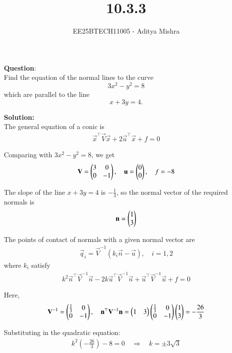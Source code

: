 \documentclass[journal]{IEEEtran}
\title{10.3.3}
\author{EE25BTECH11005 - Aditya Mishra}
\begin{document}
\maketitle

\textbf{Question}:\\
Find the equation of the normal lines to the curve 
\[
3x^2 - y^2 = 8
\] 
which are parallel to the line 
\[
x + 3y = 4.
\]

\textbf{Solution:}\\

The general equation of a conic is 
\begin{align}
\vec{x}^\top \vec{V} \vec{x} + 2\vec{u}^\top \vec{x} + f = 0
\end{align}

Comparing with $3x^2 - y^2 = 8$, we get
\begin{align}
\mathbf{V} = \begin{pmatrix}3 & 0 \\ 0 & -1\end{pmatrix},\quad
\mathbf{u} = \begin{pmatrix}0 \\ 0\end{pmatrix},\quad
f = -8
\end{align}

The slope of the line $x + 3y = 4$ is $-\frac{1}{3}$, so the normal vector of the required normals is
\begin{align}
\mathbf{n} = \begin{pmatrix}1 \\ 3\end{pmatrix}
\end{align}

The points of contact of normals with a given normal vector are
\begin{align}
\vec{q}_i = \vec{V}^{-1} (k_i \vec{n} - \vec{u}), \quad i = 1,2
\end{align}
where $k_i$ satisfy
\begin{align}
k^2 \vec{n}^\top \vec{V}^{-1} \vec{n} - 2 k \vec{u}^\top \vec{V}^{-1} \vec{n} + \vec{u}^\top \vec{V}^{-1} \vec{u} + f = 0
\end{align}

Here,
\begin{align}
\mathbf{V}^{-1} = \begin{pmatrix}\tfrac{1}{3} & 0 \\ 0 & -1\end{pmatrix}, \quad
\mathbf{n}^\top \mathbf{V}^{-1} \mathbf{n} = \begin{pmatrix}1 & 3\end{pmatrix} \begin{pmatrix}\tfrac{1}{3} & 0 \\ 0 & -1\end{pmatrix} \begin{pmatrix}1 \\ 3\end{pmatrix} = -\frac{26}{3}
\end{align}

Substituting in the quadratic equation:
\begin{align}
k^2 \left(-\frac{26}{3}\right) - 8 = 0
\quad \Rightarrow \quad k = \pm 3\sqrt{3}
\end{align}
\end{document}
